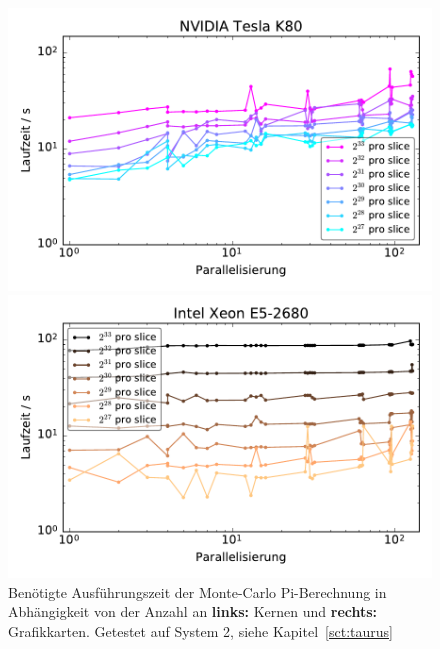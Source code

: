 \begin{figure}[H]
	\centering
	\begin{minipage}{0.5\linewidth}
		\includegraphics[width=\linewidth]{cluster-strong-scaling-gpu}
	\end{minipage}\begin{minipage}{0.5\linewidth}
		\includegraphics[width=\linewidth]{cluster-strong-scaling-cpu}
	\end{minipage}
	\caption{Benötigte Ausführungszeit der Monte-Carlo Pi-Berechnung in Abhängigkeit von der Anzahl an \textbf{links:} Kernen und \textbf{rechts:} Grafikkarten. Getestet auf System 2, siehe Kapitel~\ref{sct:taurus}}
	\label{fig:montepistrongscaling}
\end{figure}


